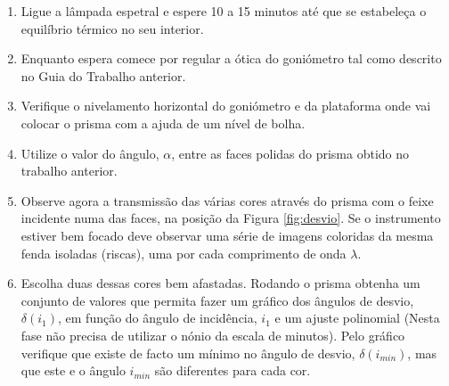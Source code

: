 \documentclass[a4paper,12pt]{article}  %
\begin{document}
\begin{enumerate}
\item Ligue  a  lâmpada  espetral  e  espere  10  a  15  minutos    até  que  se  estabeleça  o 
equilíbrio térmico no seu interior. 
\item Enquanto espera comece por regular a ótica  do goniómetro tal como descrito no Guia do Trabalho anterior.
\item Verifique o nivelamento horizontal do goniómetro e da plataforma onde vai colocar o prisma com a ajuda de um nível de bolha. 
\item Utilize o valor do ângulo, $\alpha$, entre as faces polidas do prisma obtido no trabalho anterior.
\item  Observe agora  a  transmissão  das várias cores  através  do  prisma  com  o  feixe  incidente  numa  das  faces, na posição da Figura \ref{fig:desvio}.  Se o instrumento estiver bem focado deve  observar   uma  série  de 
imagens coloridas da mesma fenda isoladas (riscas), uma por cada comprimento de onda $\lambda$.
\item Escolha duas dessas cores bem afastadas. Rodando o prisma obtenha um conjunto de valores que permita fazer um gráfico dos ângulos de desvio, $\delta(i_1)$, 
em função do ângulo de incidência, $i_1$ e um ajuste polinomial (Nesta fase não precisa de utilizar o nónio da escala de minutos). Pelo gráfico verifique que existe de facto um mínimo no ângulo de desvio,  $ \delta(i_{min})$, mas  que este e o ângulo $i_{min}$ são  diferentes para cada cor.


\end{enumerate}
\end{document}
